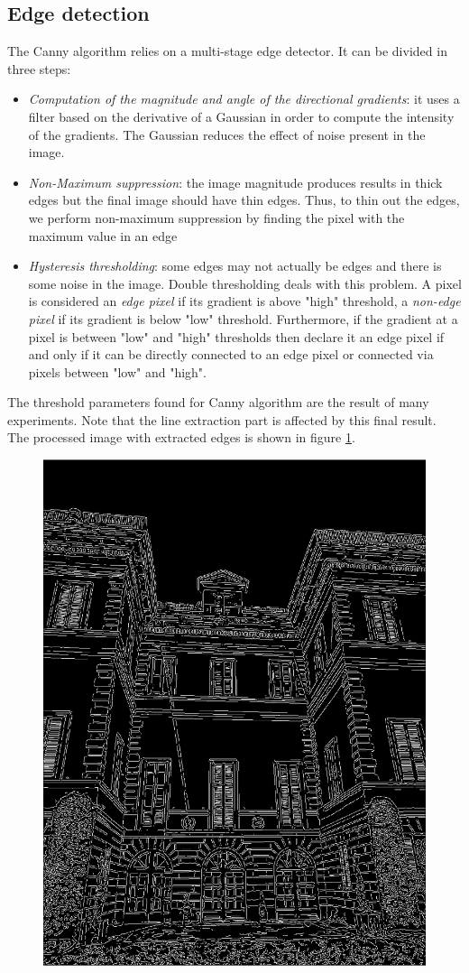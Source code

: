 \documentclass[11pt, oneside]{article}
\begin{document}
\subsection{Edge detection}
The Canny algorithm relies on a multi-stage edge detector. It can be divided in three steps:
\begin{itemize}
	\item \textit{Computation of the magnitude and angle of the directional gradients}: it uses a filter based on the derivative of a Gaussian in order to compute the intensity of the gradients. The Gaussian reduces the effect of noise present in the image.
	\item \textit{Non-Maximum suppression}: the image magnitude produces results in thick edges but the final image should have thin edges. Thus, to thin out the edges, we perform non-maximum suppression by finding the pixel with the maximum value in an edge
	\item \textit{Hysteresis thresholding}: some edges may not actually be edges and there is some noise in the image. Double thresholding deals with this problem. A pixel is considered an \textit{edge pixel} if its gradient is above "high" threshold, a \textit{non-edge pixel} if its gradient is below "low" threshold. Furthermore, if the gradient at a pixel is between "low" and "high" thresholds then declare it an edge pixel if and only if it can be directly connected to an edge pixel or connected via pixels between "low" and "high".
\end{itemize}
The threshold parameters found for Canny algorithm are the result of many experiments. Note that the line extraction part is affected by this final result.
The processed image with extracted edges is shown in figure \ref{image_edges}.
\begin{figure}[!h]
	\centering
	\includegraphics[width=0.43\linewidth]{image_edges.png}
	\label{image_edges}
\end{figure}
\end{document}
